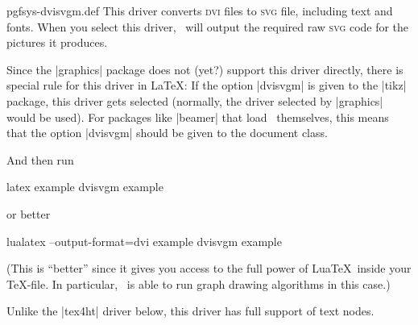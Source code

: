 \begin{filedescription}{pgfsys-dvisvgm.def}
    This driver converts \textsc{dvi} files to \textsc{svg} file, including
    text and fonts. When you select this driver, \pgfname\ will output the
    required raw \textsc{svg} code for the pictures it produces.

    Since the |graphics| package does not (yet?) support this driver directly,
    there is special rule for this driver in \LaTeX: If the option |dvisvgm| is
    given to the |tikz| package, this driver gets selected (normally, the
    driver selected by |graphics| would be used). For packages like |beamer|
    that load \pgfname\ themselves, this means that the option |dvisvgm| should
    be given to the document class.

    And then run
\begin{codeexample}
latex example
dvisvgm example
\end{codeexample}
    or better
\begin{codeexample}
lualatex --output-format=dvi example
dvisvgm example
\end{codeexample}
    (This is ``better'' since it gives you access to the full power of Lua\TeX\
    inside your \TeX-file. In particular, \tikzname\ is able to run graph
    drawing algorithms in this case.)

    Unlike the |tex4ht| driver below, this driver has full support of text
    nodes.
\end{filedescription}

